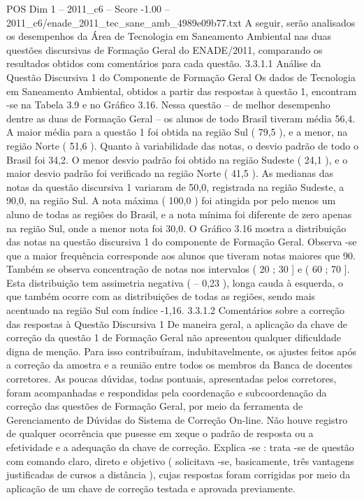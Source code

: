 \begin{textsample}{POS Dim 1 – 2011\_c6 – Score -1.00 – 2011\_c6/enade\_2011\_tec\_sane\_amb\_4989e09b77.txt}
A seguir, serão analisados os desempenhos da Área de Tecnologia em Saneamento Ambiental nas duas questões discursivas de Formação Geral do ENADE/2011, comparando os resultados obtidos com comentários para cada questão. 3.3.1.1 Análise da Questão Discursiva 1 do Componente de Formação Geral Os dados de Tecnologia em Saneamento Ambiental, obtidos a partir das respostas à questão 1, encontram -se na Tabela 3.9 e no Gráfico 3.16.
Nessa questão – de melhor desempenho dentre as duas de Formação Geral – os alunos de todo Brasil tiveram média 56,4.
A maior média para a questão 1 foi obtida na região Sul ( 79,5 ), e a menor, na região Norte ( 51,6 ).
Quanto à variabilidade das notas, o desvio padrão de todo o Brasil foi 34,2.
O menor desvio padrão foi obtido na região Sudeste ( 24,1 ), e o maior desvio padrão foi verificado na região Norte ( 41,5 ).
As medianas das notas da questão discursiva 1 variaram de 50,0, registrada na região Sudeste, a 90,0, na região Sul.
A nota máxima ( 100,0 ) foi atingida por pelo menos um aluno de todas as regiões do Brasil, e a nota mínima foi diferente de zero apenas na região Sul, onde a menor nota foi 30,0.
O Gráfico 3.16 mostra a distribuição das notas na questão discursiva 1 do componente de Formação Geral.
Observa -se que a maior frequência corresponde aos alunos que tiveram notas maiores que 90.
Também se observa concentração de notas nos intervalos ( 20 ; 30 ] e ( 60 ; 70 ].
Esta distribuição tem assimetria negativa ( – 0,23 ), longa cauda à esquerda, o que também ocorre com as distribuições de todas as regiões, sendo mais acentuado na região Sul com índice -1,16. 3.3.1.2 Comentários sobre a correção das respostas à Questão Discursiva 1 De maneira geral, a aplicação da chave de correção da questão 1 de Formação Geral não apresentou qualquer dificuldade digna de menção.
Para isso contribuíram, indubitavelmente, os ajustes feitos após a correção da amostra e a reunião entre todos os membros da Banca de docentes corretores.
As poucas dúvidas, todas pontuais, apresentadas pelos corretores, foram acompanhadas e respondidas pela coordenação e subcoordenação da correção das questões de Formação Geral, por meio da ferramenta de Gerenciamento de Dúvidas do Sistema de Correção On-line.
Não houve registro de qualquer ocorrência que pusesse em xeque o padrão de resposta ou a efetividade e a adequação da chave de correção.
Explica -se : trata -se de questão com comando claro, direto e objetivo ( solicitava -se, basicamente, três vantagens justificadas de cursos a distância ), cujas respostas foram corrigidas por meio da aplicação de um chave de correção testada e aprovada previamente.

\end{textsample}
